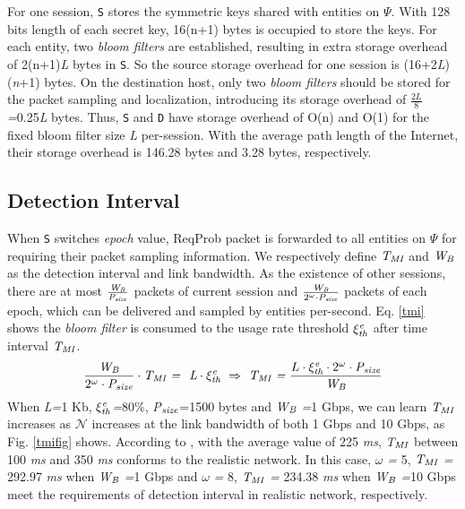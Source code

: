 For one session, {\tt S} stores the symmetric keys shared with entities on $\Psi$. With 128 bits length of each secret key, 16(n+1) bytes is occupied to store the keys. 
For each entity, two \emph{bloom filters} are established, resulting in extra storage overhead of 2(n+1)\emph{L} bytes in {\tt S}. So the source storage overhead for one session is (16+2\emph{L})(\emph{n}+1) bytes. On the destination host, only two \emph{bloom filters} should be stored for the packet sampling and localization, introducing its storage overhead of $\frac{2L}{8}$\emph{=}0.25\emph{L} bytes. 
Thus, {\tt S} and {\tt D} have storage overhead of O(n) and O(1) for the fixed bloom filter size \emph{L} per-session. With the average path length of the Internet, their storage overhead is 146.28 bytes and 3.28 bytes, respectively.
\vspace{-0.1in}
\subsection{Detection Interval}
\label{monitoringinterval}
When {\tt S} switches \emph{epoch} value, ReqProb packet is forwarded to all entities on $\Psi$ for requiring their packet sampling information. We respectively define $\emph{T}_{\emph{MI}}$ and $\emph{W}_\emph{B}$ as the detection interval and link bandwidth. As the existence of other sessions, there are at most $\frac{\emph{W}_\emph{B}}{\emph{P}_{\emph{size}}}$ packets of current session and $\frac{\emph{W}_\emph{B}}{2^\omega\cdot\emph{P}_{\emph{size}}}$ packets of each epoch, which can be delivered and sampled by entities per-second. Eq. \ref{tmi} shows the \emph{bloom filter} is consumed to the usage rate threshold $\xi_{\emph{th}}^\emph{e}$ after time interval $\emph{T}_{\emph{MI}}$. 
\begin{equation}\label{tmi}
\begin{split}
\frac{\emph{W}_\emph{B}}{2^\omega\cdot\emph{P}_{\emph{size}}}\cdot\emph{T}_{\emph{MI}} ~\emph{=~ L}\cdot\xi_{\emph{th}}^\emph{e}
~\Rightarrow~\emph{T}_{\emph{MI}} ~\emph{=}~\frac{{L}\cdot\xi_{\emph{th}}^\emph{e}\cdot2^\omega\cdot\emph{P}_{\emph{size}}}{\emph{W}_\emph{B}}
\end{split}
\end{equation}
When \emph{L=}1 Kb, $\xi_{\emph{th}}^\emph{e}$\emph{=}80\%, \emph{P}$_{\emph{size}}$=1500 bytes and \emph{W}$_\emph{B}$ \emph{=}1 Gbps, we can learn $\emph{T}_{\emph{MI}}$ increases as $\mathcal{N}$ increases at the link bandwidth of both 1 Gbps and 10 Gbps, %
as Fig. \ref{tmifig} shows. According to \cite{basescu2016high} \cite{tmi}, with the average value of 225 \emph{ms}, \emph{T}$_{\emph{MI}}$ between 100 \emph{ms} and 350 \emph{ms} conforms to the realistic network. In this case, $\omega$ \emph{=} 5, $\emph{T}_{\emph{MI}}$ \emph{=} 292.97 \emph{ms} when \emph{W}$_\emph{B}$ \emph{=}1 Gbps and $\omega$ \emph{=} 8, $\emph{T}_{\emph{MI}}$ \emph{=} 234.38 \emph{ms} when \emph{W}$_\emph{B}$ \emph{=}10 Gbps meet the requirements of detection interval in realistic network, respectively. 